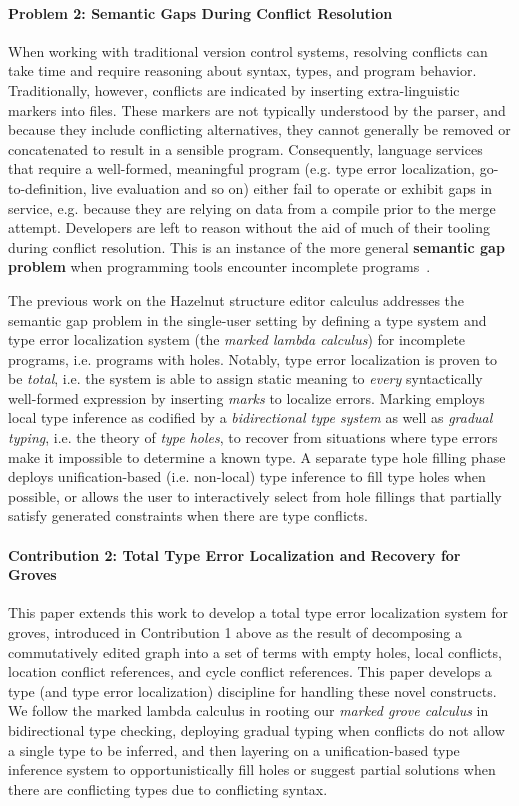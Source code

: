 \paragraph{Problem 2: Semantic Gaps During Conflict Resolution}
When working with traditional version control systems,
resolving conflicts can take time and require reasoning about 
syntax, types, and program behavior.
Traditionally, however, conflicts are indicated by inserting extra-linguistic markers
into files. 
These markers are not typically understood by the parser, and 
because they include conflicting alternatives, they cannot generally be removed 
or concatenated to result in a sensible program. 
Consequently, language services that require a well-formed, meaningful program
(e.g. type error localization, go-to-definition, live evaluation and so on) 
either fail to operate or exhibit gaps in service, e.g. because they are relying on 
data from a compile prior to the merge attempt. Developers are left to reason without the aid of much of their tooling during conflict resolution. This is an instance of the more general \textbf{semantic gap problem} when programming tools encounter incomplete programs~\cite{HazelSNAPL}. 

The previous work on the Hazelnut structure editor calculus addresses the semantic gap problem in the single-user setting by 
defining a type system and type error localization system (the \emph{marked lambda calculus}) for incomplete programs, i.e. programs with holes. 
Notably, type error localization is proven to be \emph{total}, i.e. the system is able to assign static meaning to \emph{every} syntactically well-formed expression by inserting \emph{marks} to localize errors. Marking employs local type inference as codified by a \emph{bidirectional type system} as well as \emph{gradual typing}, i.e. the theory of \emph{type holes}, to recover from situations where type errors make it impossible to 
determine a known type. 
A separate type hole filling phase deploys unification-based (i.e. non-local) type inference to fill type holes when possible, 
or allows the user to interactively select from hole fillings that partially satisfy generated constraints when there are type conflicts.


\paragraph{Contribution 2: Total Type Error Localization and Recovery for Groves}

This paper extends this work to develop a total type error localization system for groves, introduced in Contribution 1 above as the result of decomposing a commutatively edited graph into a set of terms with empty holes, local conflicts, location conflict references, and cycle conflict references. This paper develops a type (and type error localization) discipline for handling these novel constructs. We follow the marked lambda calculus in rooting our \emph{marked grove calculus} in bidirectional type checking, deploying gradual typing when conflicts do not allow a single type to be inferred, and then layering on a unification-based type inference system to opportunistically fill holes or suggest partial solutions when there are conflicting types due to conflicting syntax.

